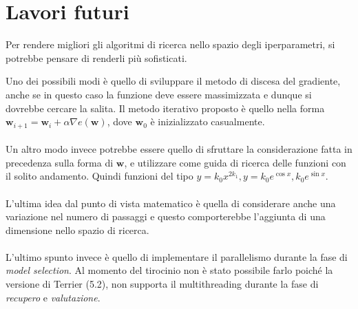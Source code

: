 \section{Lavori futuri}\label{chapter:fuwork}
Per rendere migliori gli algoritmi di ricerca nello spazio degli iperparametri, si
potrebbe pensare di renderli più sofisticati.

Uno dei possibili modi è quello di sviluppare il metodo
di discesa del gradiente, anche se in questo caso la funzione
deve essere massimizzata e dunque si dovrebbe cercare la salita.
Il metodo iterativo proposto è quello nella forma
$\boldsymbol{w}_{i+1} = \boldsymbol{w}_{i} + \alpha \nabla e\left(\boldsymbol{w}\right)$,
dove $\boldsymbol{w}_0$ è inizializzato casualmente.
\\
\\
Un altro modo invece potrebbe essere quello di sfruttare la considerazione
fatta in precedenza sulla forma di $\boldsymbol{w}$, e utilizzare come guida di ricerca delle funzioni
con il solito andamento. Quindi funzioni del tipo $y=k_0 x^{2k_1}, y=k_0e^{\cos x}, k_0e^{\sin x}$.
\\
\\
L'ultima idea dal punto di vista matematico è quella di considerare anche una variazione nel numero di passaggi
e questo comporterebbe l'aggiunta di una dimensione nello spazio di ricerca.
\\
\\
L'ultimo spunto invece è quello di implementare il parallelismo durante la fase di \textit{model selection}.
Al momento del tirocinio non è stato possibile farlo poiché la versione di Terrier (5.2), 
non supporta il multithreading durante la fase di \textit{recupero} e \textit{valutazione}.